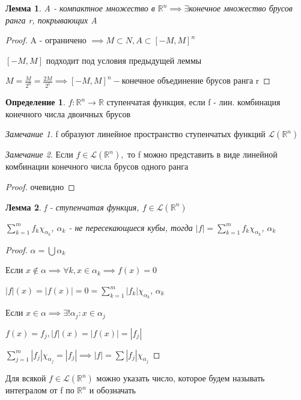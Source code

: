 \documentclass[a4paper, 12pt]{article}
\newtheorem{lemma}{Лемма}[section]
\theoremstyle{definition}
\newtheorem*{definition}{Определение}
\theoremstyle{remark}
\newtheorem*{remark}{Замечание}
\begin{document}
\begin{lemma}
     A - компактное множество в $\mathbb{R}^n\implies\exists$конечное множество брусов ранга r, покрывающих A

\end{lemma}
\begin{proof}
     A -  ограничено $\implies M\subset N, A\subset [-M, M]^n$

     $[-M, M]$ подходит под условия предыдущей леммы

     $M = \frac{M}{2^0} = \frac{2M}{2^1}\implies [-M, M]^n - $конечное объединение брусов
     ранга r
\end{proof}
\begin{definition}
     $f:\mathbb{R} ^n \to \mathbb{R} $ ступенчатая функция, если f - лин. комбинация конечного числа двоичных брусов
\end{definition}
\begin{remark}
     f образуют линейное пространство ступенчатых функций $\mathcal{L}(\mathbb{R} ^n) $

\end{remark}
\begin{remark}
     Если $f\in \mathcal{L}(\mathbb{R} ^n),$ то f можно представить в виде 
     линейной комбинации конечного числа брусов одного ранга
\end{remark}
\begin{proof}
     очевидно
\end{proof}
\begin{lemma}
     f - ступенчатая функция, $f\in \mathcal{L}(\mathbb{R} ^n)$

     $\sum_{k=1}^m f_k \chi_{\alpha_k}$, $\alpha_k$ -  не пересекающиеся кубы, тогда $|f| = \sum_{k=1}^m f_k \chi_{\alpha_k}$, $\alpha_k$
\end{lemma}
\begin{proof}
     $\alpha = \bigcup\alpha_k$

     Если $x\notin\alpha\implies\forall k, x\in\alpha_k\implies f(x) = 0$

     $|f|(x) = |f(x)| = 0 = \sum_{k=1}^m |f_k |\chi_{\alpha_k}$, $\alpha_k$

     Если $x\in \alpha\implies\exists!\alpha_j : x\in \alpha_j$

     $f(x) = f_j, |f|(x) = |f(x)| = |f_j|$

     $\sum_{j=1}^m |f_j |\chi_{\alpha_j} = |f_j|\implies |f| = \sum |f_j |\chi_{\alpha_j}$
\end{proof}
Для всякой $f\in \mathcal{L}(\mathbb{R} ^n)$ можно указать число, которое будем называть
интегралом от f по $\mathbb{R} ^n$ и обозначать
\end{document}
